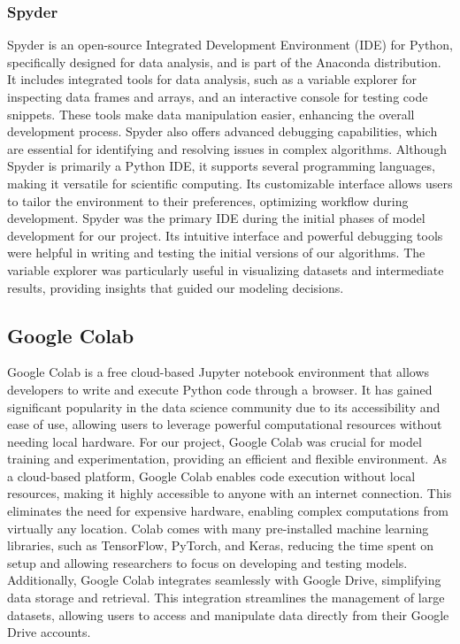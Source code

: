 \subsubsection{Spyder}

Spyder is an open-source Integrated Development Environment (IDE) for Python, specifically designed for data analysis, and is part of the Anaconda distribution. It includes integrated tools for data analysis, such as a variable explorer for inspecting data frames and arrays, and an interactive console for testing code snippets. These tools make data manipulation easier, enhancing the overall development process. Spyder also offers advanced debugging capabilities, which are essential for identifying and resolving issues in complex algorithms. Although Spyder is primarily a Python IDE, it supports several programming languages, making it versatile for scientific computing. Its customizable interface allows users to tailor the environment to their preferences, optimizing workflow during development. Spyder was the primary IDE during the initial phases of model development for our project. Its intuitive interface and powerful debugging tools were helpful in writing and testing the initial versions of our algorithms. The variable explorer was particularly useful in visualizing datasets and intermediate results, providing insights that guided our modeling decisions.


\subsection{Google Colab}

Google Colab is a free cloud-based Jupyter notebook environment that allows developers to write and execute Python code through a browser. It has gained significant popularity in the data science community due to its accessibility and ease of use, allowing users to leverage powerful computational resources without needing local hardware. For our project, Google Colab was crucial for model training and experimentation, providing an efficient and flexible environment. As a cloud-based platform, Google Colab enables code execution without local resources, making it highly accessible to anyone with an internet connection. This eliminates the need for expensive hardware, enabling complex computations from virtually any location. Colab comes with many pre-installed machine learning libraries, such as TensorFlow, PyTorch, and Keras, reducing the time spent on setup and allowing researchers to focus on developing and testing models. Additionally, Google Colab integrates seamlessly with Google Drive, simplifying data storage and retrieval. This integration streamlines the management of large datasets, allowing users to access and manipulate data directly from their Google Drive accounts.

